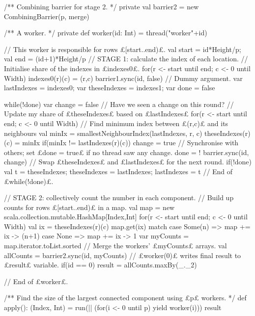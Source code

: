 \begin{answerI}
\begin{scala}
{  /** Combining barrier for stage 2. */
  private val barrier2 = new CombiningBarrier(p, merge)

  /** A worker. */
  private def worker(id: Int) = thread("worker"+id){
    // This worker is responsible for rows £[start..end)£.
    val start = id*Height/p; val end = (id+1)*Height/p
    // STAGE 1: calculate the index of each location.
    // Initialise share of the indexes in £indexes0£.
    for(r <- start until end; c <- 0 until Width) indexes0(r)(c) = (r,c)
    barrier1.sync(id, false) // Dummy argument.
    var lastIndexes = indexes0; var theseIndexes = indexes1; var done = false

    while(!done){
      var change = false // Have we seen a change on this round?
      // Update my share of £theseIndexes£ based on £lastIndexes£
      for(r <- start until end; c <- 0 until Width){
        // Find minimum index between £(r,c)£ and its neighbours
        val minIx = smallestNeighbourIndex(lastIndexes, r, c)
        theseIndexes(r)(c) = minIx
        if(minIx != lastIndexes(r)(c)) change = true
      }
      // Synchronise with others; set £done = true£ if no thread saw any change.
      done = ! barrier.sync(id, change)
      // Swap £theseIndexes£ and £lastIndexes£ for the next round.
      if(!done){ val t = theseIndexes; theseIndexes = lastIndexes; lastIndexes = t }
    } // End of £while(!done)£.

    // STAGE 2: collectively count the number in each component.
    // Build up counts for rows £[start..end)£ in a map.
    val map = new scala.collection.mutable.HashMap[Index,Int]
    for(r <- start until end; c <- 0 until Width){
      val ix = theseIndexes(r)(c)
      map.get(ix) match{
        case Some(n) => map += ix -> (n+1)
        case None => map += ix -> 1
      }
    }
    var myCounts = map.iterator.toList.sorted
    // Merge the workers' £myCounts£ arrays.
    val allCounts = barrier2.sync(id, myCounts)
    // £worker(0)£ writes final result to £result£ variable.
    if(id == 0) result = allCounts.maxBy(_._2)
  } // End of £worker£.


  /** Find the size of the largest connected component using £p£ workers. */
  def apply(): (Index, Int) = {
    run(|| (for(i <- 0 until p) yield worker(i)))
    result
  }
}
\end{scala}
\end{answerI}
